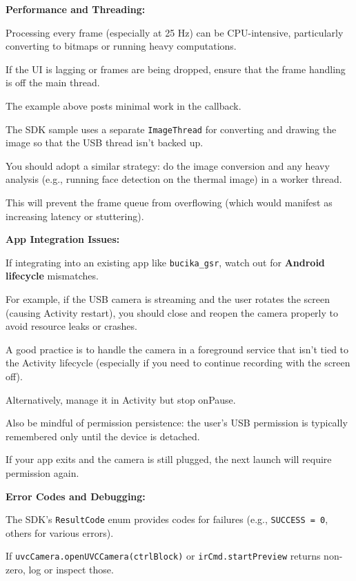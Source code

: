{\item \textbf{Performance and Threading:}

Processing every frame (especially at 25 Hz) can be CPU-intensive, particularly
converting to bitmaps or running heavy computations.

If the UI is lagging or frames are being dropped, ensure that the frame handling is
off the main thread.

The example above posts minimal work in the callback.

The SDK sample uses a separate \texttt{ImageThread} for converting and drawing the
image so that the USB thread isn't backed up.

You should adopt a similar strategy: do the image conversion and any heavy analysis
(e.g., running face detection on the thermal image) in a worker thread.

This will prevent the frame queue from overflowing (which would manifest as
increasing latency or stuttering).

\item \textbf{App Integration Issues:}

If integrating into an existing app like \texttt{bucika_gsr}, watch out for
\textbf{Android lifecycle}
 mismatches.

For example, if the USB camera is streaming and the user rotates the screen (causing
Activity restart), you should close and reopen the camera properly to avoid resource
leaks or crashes.

A good practice is to handle the camera in a foreground service that isn't tied to
the Activity lifecycle (especially if you need to continue recording with the screen
off).

Alternatively, manage it in Activity but stop onPause.

Also be mindful of permission persistence: the user's USB permission is typically
remembered only until the device is detached.

If your app exits and the camera is still plugged, the next launch will require
permission again.

\item \textbf{Error Codes and Debugging:}

The SDK's \texttt{ResultCode} enum provides codes for failures (e.g., \texttt{SUCCESS
= 0}, others for various errors).

If \texttt{uvcCamera.openUVCCamera(ctrlBlock)} or \texttt{irCmd.startPreview} returns
non-zero, log or inspect those.

}
